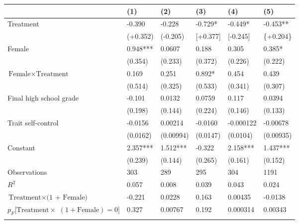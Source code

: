 \footnotesize
\newcolumntype{T}{S[table-format=+1.3, round-mode=places, round-precision=3, table-space-text-pre={**}, table-space-text-post={-**}, round-integer-to-decimal=false]}
\begin{tabularx}
	{\textwidth}
	{@{} L @{\hspace{1.5em}} T @{\hspace{1em}} T @{\hspace{1em}} T @{\hspace{1em}} T @{\hspace{1em}} T @{}}
\toprule
&	{(1)}	&	{(2)}	&	{(3)}	&	{(4)}	&	{(5)} \\
\midrule
Treatment
	&	-0.390	&	-0.228	&	-0.729*	&	-0.449*	&	-0.453**	\\
	&	(+0.352)	&	(-0.205)	&	[+0.377]	&	[-0.245]	&	{\{}+0.204{\}}	\\
Female
	&	0.948***	&	0.0607	&	0.188	&	0.305	&	0.385*	\\
	&	(0.354)	&	(0.233)	&	(0.372)	&	(0.226)	&	(0.222)	\\
$\text{Female} \times \text{Treatment}$
	&	0.169	&	0.251	&	0.892*	&	0.454	&	0.439	\\
	&	(0.514)	&	(0.325)	&	(0.533)	&	(0.341)	&	(0.307)	\\
Final high school grade
	&	-0.101	&	0.0132	&	0.0759	&	0.117	&	0.0394	\\
	&	(0.198)	&	(0.144)	&	(0.224)	&	(0.146)	&	(0.133)	\\
Trait self-control
	&	-0.0156	&	0.00214	&	-0.0160	&	-0.000122	&	-0.00678	\\
	&	(0.0162)	&	(0.00994)	&	(0.0147)	&	(0.0104)	&	(0.00935)	\\
Constant
	&	2.357***	&	1.512***	&	-0.322	&	2.158***	&	1.437***	\\
	&	(0.239)	&	(0.144)	&	(0.265)	&	(0.161)	&	(0.152)	\\
\midrule
Observations
	&	{303}	&	{289}	&	{295}	&	{304}	&	{1191}	\\
$R^2$
	&	0.057	&	0.008	&	0.039	&	0.043	&	0.024	\\
\midrule
$\text{Treatment} \times \text{(1 + Female)}$
	&	-0.221	&	0.0228	&	0.163	&	0.00435	&	-0.0138	\\
$p_F[\text{Treatment} \times {}$ \newline\hspace{12pt}$(1 + \text{Female}) = 0]$
	&	0.327	&	0.00767	&	0.192	&	0.000314	&	0.00343	\\
\bottomrule
\addlinespace
{}
\end{tabularx}
